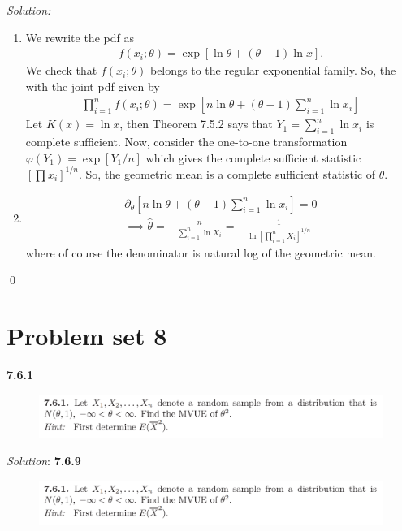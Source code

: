 \documentclass{book}
\theoremstyle{definition}
\newcommand{\p}{\partial}
\newcommand{\nn}{\nonumber}
\newcommand{\f}[2]{\frac{#1}{#2}}
\newcommand{\lb}{\left[}
\newcommand{\rb}{\right]}
\begin{document}
\noindent \textit{Solution:}  

\begin{enumerate}
	\item We rewrite the pdf as
	\begin{align}
	f(x_i;\theta) = \exp\lb \ln \theta + (\theta - 1)\ln x \rb.
	\end{align}
	We check that $f(x_i;\theta)$ belongs to the regular exponential family. So, the with the joint pdf given by
	\begin{align}
	\prod^n_{i=1}f(x_i;\theta) = \exp\lb n\ln \theta + (\theta-1)\sum^n_{i=1}\ln x_i \rb
	\end{align}
	Let $K(x)  = \ln x$, then Theorem 7.5.2 says that $Y_1 = \sum^n_{i=1}\ln x_i$ is complete sufficient. Now, consider the one-to-one transformation $\varphi(Y_1) = \exp\lb Y_1/n \rb $ which gives the complete sufficient statistic $\lb \prod x_i\rb^{1/n}$. So, the geometric mean is a complete sufficient statistic of $\theta$. 
	
	\item 
	\begin{align}
	\p_\theta \lb n\ln \theta + (\theta-1)\sum^n_{i=1}\ln x_i \rb = 0\nn\\
	\implies \hat\theta = -\f{n}{\sum^n_{i=1}\ln X_i} = -\f{1}{\ln \lb\prod^n_{i=1}X_i\rb^{1/n}}
	\end{align}
	where of course the denominator is natural log of the geometric mean. 
\end{enumerate}\qed



\newpage






\section{Problem set 8}

\noindent\textbf{7.6.1}
\begin{figure}[!htb]
	\centering
	\includegraphics[scale=0.5]{761}
\end{figure}

\noindent\textit{Solution}:
\newpage
\noindent\textbf{7.6.9}
\begin{figure}[!htb]
	\centering
	\includegraphics[scale=0.5]{761}
\end{figure}
\end{document}
